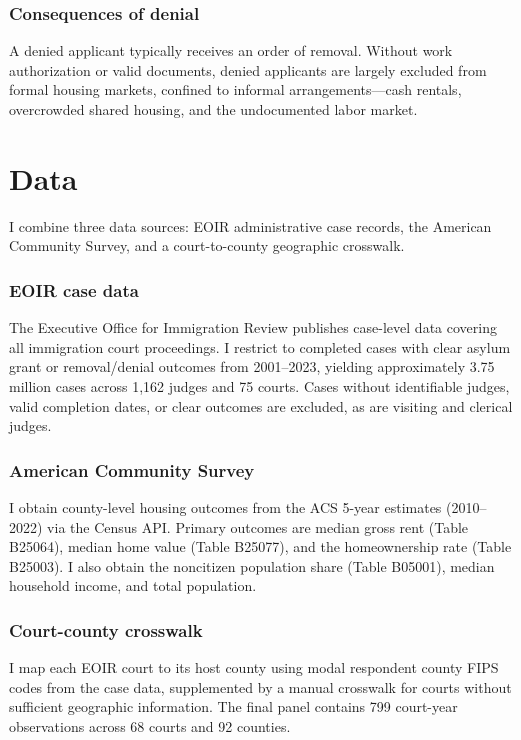 \documentclass[12pt]{article}
\begin{document}
\subsubsection*{Consequences of denial} A denied applicant typically receives an order of removal. Without work authorization or valid documents, denied applicants are largely excluded from formal housing markets, confined to informal arrangements---cash rentals, overcrowded shared housing, and the undocumented labor market.


\section{Data}

I combine three data sources: EOIR administrative case records, the American Community Survey, and a court-to-county geographic crosswalk.

\subsubsection*{EOIR case data} The Executive Office for Immigration Review publishes case-level data covering all immigration court proceedings. I restrict to completed cases with clear asylum grant or removal/denial outcomes from 2001--2023, yielding approximately 3.75 million cases across 1,162 judges and 75 courts. Cases without identifiable judges, valid completion dates, or clear outcomes are excluded, as are visiting and clerical judges.

\subsubsection*{American Community Survey} I obtain county-level housing outcomes from the ACS 5-year estimates (2010--2022) via the Census API. Primary outcomes are median gross rent (Table B25064), median home value (Table B25077), and the homeownership rate (Table B25003). I also obtain the noncitizen population share (Table B05001), median household income, and total population.

\subsubsection*{Court-county crosswalk} I map each EOIR court to its host county using modal respondent county FIPS codes from the case data, supplemented by a manual crosswalk for courts without sufficient geographic information. The final panel contains 799 court-year observations across 68 courts and 92 counties.
\end{document}
